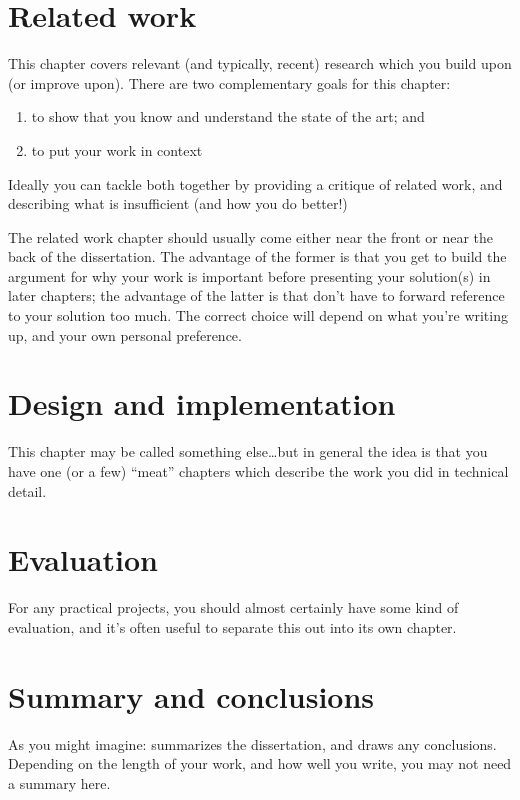 \documentclass[12pt,a4paper,twoside]{report}
\begin{document}
\chapter{Related work}

This chapter covers relevant (and typically, recent) research
which you build upon (or improve upon). There are two complementary
goals for this chapter:
\begin{enumerate}
  \item to show that you know and understand the state of the art; and
  \item to put your work in context
\end{enumerate}

Ideally you can tackle both together by providing a critique of
related work, and describing what is insufficient (and how you do
better!)

The related work chapter should usually come either near the front or
near the back of the dissertation. The advantage of the former is that
you get to build the argument for why your work is important before
presenting your solution(s) in later chapters; the advantage of the
latter is that don't have to forward reference to your solution too
much. The correct choice will depend on what you're writing up, and
your own personal preference.

\chapter{Design and implementation}

This chapter may be called something else\ldots but in general the
idea is that you have one (or a few) ``meat'' chapters which describe
the work you did in technical detail.


\chapter{Evaluation}

For any practical projects, you should almost certainly have some kind
of evaluation, and it's often useful to separate this out into its own
chapter.


\chapter{Summary and conclusions}

As you might imagine: summarizes the dissertation, and draws any
conclusions. Depending on the length of your work, and how well you
write, you may not need a summary here.
\end{document}

